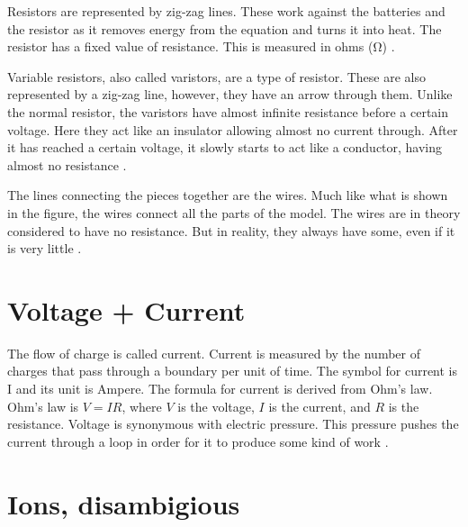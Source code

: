 \documentclass[../../Orator]{subfiles}
\begin{document}
Resistors are represented by zig-zag lines. These work against the batteries and the resistor as it removes energy from the equation and turns it into heat. The resistor has a fixed value of resistance. This is measured in ohms (\unit{\ohm}) \cite{}.

Variable resistors, also called varistors, are a type of resistor. These are also represented by a zig-zag line, however, they have an arrow through them. Unlike the normal resistor, the varistors have almost infinite resistance before a certain voltage. Here they act like an insulator allowing almost no current through. After it has reached a certain voltage, it slowly starts to act like a conductor, having almost no resistance \cite{}. 

The lines connecting the pieces together are the wires. Much like what is shown in the figure, the wires connect all the parts of the model. The wires are in theory considered to have no resistance. But in reality, they always have some, even if it is very little \cite{}. 


 \section{Voltage + Current}
The flow of charge is called current. Current is measured by the number of charges that pass through a boundary per unit of time. The symbol for current is I and its unit is Ampere. The formula for current is derived from Ohm's law. Ohm's law is \(V=IR\), where \(V\) is the voltage, \(I\) is the current, and \(R\) is the resistance. Voltage is synonymous with electric pressure. This pressure pushes the current through a loop in order for it to produce some kind of work \cite{}. 


\section{Ions, disambigious}


\end{document}
